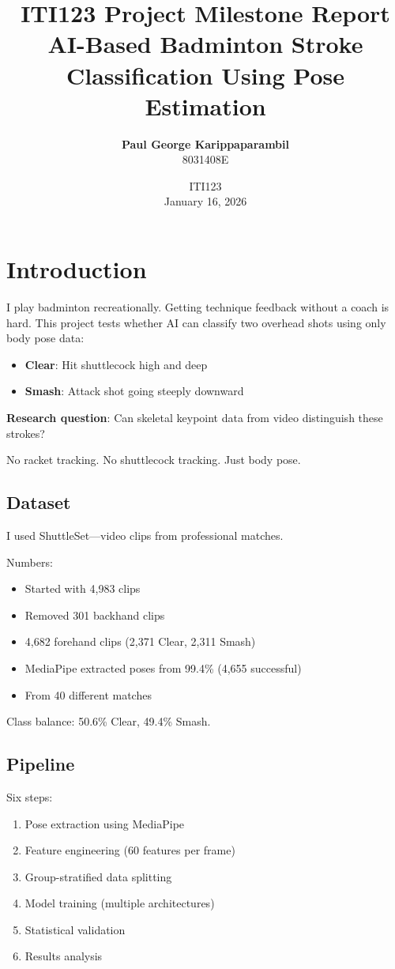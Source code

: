 \documentclass[11pt,a4paper]{article}
\title{\textbf{ITI123 Project Milestone Report}\\\vspace{0.3cm}AI-Based Badminton Stroke Classification Using Pose Estimation}
\author{\textbf{Paul George Karippaparambil}\\8031408E}
\date{ITI123\\January 16, 2026}
\begin{document}
\maketitle
\thispagestyle{empty}

\section{Introduction}

I play badminton recreationally. Getting technique feedback without a coach is hard. This project tests whether AI can classify two overhead shots using only body pose data:

\begin{itemize}
\item \textbf{Clear}: Hit shuttlecock high and deep
\item \textbf{Smash}: Attack shot going steeply downward
\end{itemize}

\textbf{Research question}: Can skeletal keypoint data from video distinguish these strokes?

No racket tracking. No shuttlecock tracking. Just body pose.

\subsection{Dataset}

I used ShuttleSet---video clips from professional matches.

\noindent Numbers:
\begin{itemize}
\item Started with 4,983 clips
\item Removed 301 backhand clips
\item 4,682 forehand clips (2,371 Clear, 2,311 Smash)
\item MediaPipe extracted poses from 99.4\% (4,655 successful)
\item From 40 different matches
\end{itemize}

Class balance: 50.6\% Clear, 49.4\% Smash.

\subsection{Pipeline}

Six steps:
\begin{enumerate}
\item Pose extraction using MediaPipe
\item Feature engineering (60 features per frame)
\item Group-stratified data splitting
\item Model training (multiple architectures)
\item Statistical validation
\item Results analysis
\end{enumerate}
\end{document}
